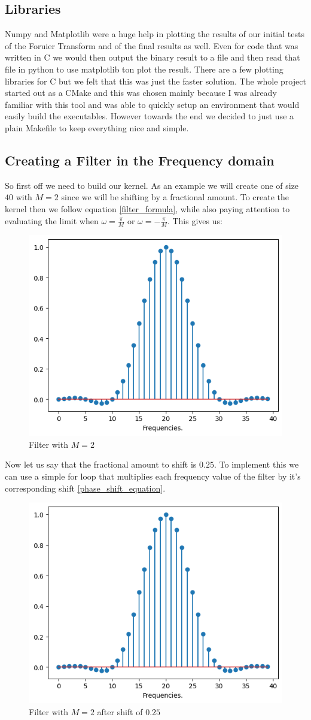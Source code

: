 \documentclass[]{usiinfbachelorproject}
\begin{document}
	\subsection{Libraries}
		Numpy and Matplotlib were a huge help in plotting the results of our initial tests of the Foruier Transform and of the final results as well. Even for code that was written in C we would then output the binary result to a file and then read that file in python to use matplotlib ton plot the result. There are a few plotting libraries for C but we felt that this was just the faster solution.
		The whole project started out as a CMake and this was chosen mainly because I was already familiar with this tool and was able to quickly setup an environment that would easily build the executables. However towards the end we decided to just use a plain Makefile to keep everything nice and simple.
		
		\subsection{Creating a Filter in the Frequency domain}
		So first off we need to build our kernel. As an example we will create one of size $40$ with $M=2$ since we will be shifting by a fractional amount. To create the kernel then we follow equation \ref{filter_formula}, while also paying attention to evaluating the limit when $\omega=\frac{\pi}{M}$ or $\omega=-\frac{\pi}{M}$. This gives us:
		\begin{figure}[h]
			\centering
			\includegraphics[width=0.4\columnwidth]{images/filter_m_2.png}
			\caption{Filter with $M=2$}
			\label{original_filter}
		\end{figure}
		
		
		
		Now let us say that the fractional amount to shift is $0.25$. To implement this we can use a simple for loop that multiplies each frequency value of the filter by it's corresponding shift \ref{phase_shift_equation}.
		\begin{figure}[h]
			\centering
			\includegraphics[width=0.4\columnwidth]{images/filter_m_2_25_shift.png}
			\caption{Filter with $M=2$ after shift of $0.25$}
			\label{shifted_filter}
		\end{figure}
		
\end{document}
